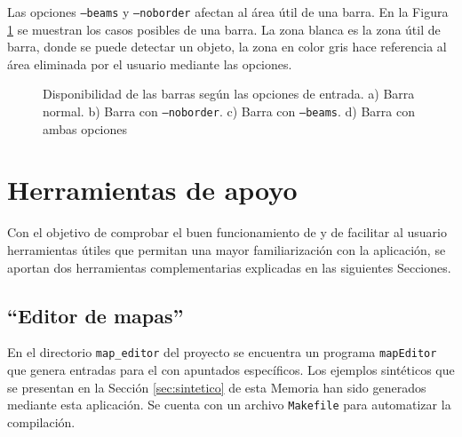 Las opciones \texttt{--beams} y \texttt{--noborder} afectan al área útil de una
barra. En la Figura \ref{fig:barras} se muestran los casos posibles de una
barra. La zona blanca es la zona útil de barra, donde se puede detectar un
objeto, la zona en color gris hace referencia al área eliminada por el usuario
mediante las opciones.

\begin{figure}[!htb]
\centering
{}
\caption{Disponibilidad de las barras según las opciones de entrada. a) Barra
normal. b) Barra con \texttt{--noborder}. c) Barra con \texttt{--beams}. d)
Barra con ambas opciones}
\label{fig:barras}
\end{figure}

\section{Herramientas de apoyo}
Con el objetivo de comprobar el buen funcionamiento de \CSUO{} y
de facilitar al usuario herramientas útiles que permitan una mayor
familiarización con la aplicación, se aportan dos herramientas complementarias
explicadas en las siguientes Secciones.
\subsection{``Editor de mapas''}
En el directorio \texttt{map\_editor} del proyecto se encuentra un programa \texttt{mapEditor} que
genera entradas para el \CSUO{} con apuntados específicos. 
Los ejemplos sintéticos que se presentan en la Sección \ref{sec:sintetico} de esta
Memoria han sido generados mediante esta aplicación. Se cuenta con un archivo
\texttt{Makefile} para automatizar la compilación.

